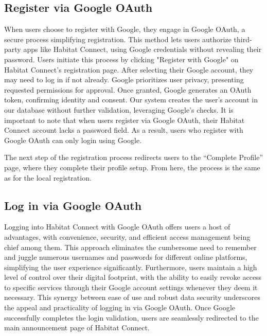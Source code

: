 \documentclass[conference]{IEEEtran}
\begin{document}
\subsection{Register via Google OAuth}
When users choose to register with Google, they engage in Google OAuth, a secure process simplifying registration. This method lets users authorize third-party apps like Habitat Connect, using Google credentials without revealing their password. Users initiate this process by clicking "Register with Google" on Habitat Connect's registration page. After selecting their Google account, they may need to log in if not already. Google prioritizes user privacy, presenting requested permissions for approval. Once granted, Google generates an OAuth token, confirming identity and consent. Our system creates the user's account in our database without further validation, leveraging Google's checks. It is important to note that when users register via Google OAuth, their Habitat Connect account lacks a password field. As a result, users who register with Google OAuth can only login using Google.

The next step of the registration process redirects users to the “Complete Profile” page, where they complete their profile setup. From here, the process is the same as for the local registration.
\subsection{Log in via Google OAuth}
Logging into Habitat Connect with Google OAuth offers users a host of advantages, with convenience, security, and efficient access management being chief among them. This approach eliminates the cumbersome need to remember and juggle numerous usernames and passwords for different online platforms, simplifying the user experience significantly. Furthermore, users maintain a high level of control over their digital footprint, with the ability to easily revoke access to specific services through their Google account settings whenever they deem it necessary. This synergy between ease of use and robust data security underscores the appeal and practicality of logging in via Google OAuth. Once Google successfully completes the login validation, users are seamlessly redirected to the main announcement page of Habitat Connect.
\end{document}
